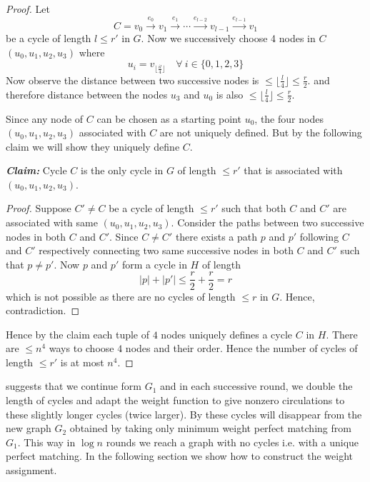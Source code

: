 \begin{proof}
	Let $$C=v_0\overset{e_0}{\longrightarrow}v_1\overset{e_1}{\longrightarrow}\cdots \overset{e_{l-2}}{\longrightarrow}v_{l-1}\overset{e_{l-1}}{\longrightarrow}v_1$$be a cycle of length $l\leq r'$ in $G$. Now we successively choose 4 nodes in $C$ $(u_0,u_1,u_2,u_3)$ where $$u_i=v_{\lfloor \frac{il}4\rfloor}\quad \forall\ i\in \{0,1,2,3\}$$Now observe the distance between two successive nodes is $\leq \lfloor \frac{l}{4}\rfloor \leq \frac{r}{2}$. and therefore distance between the nodes $u_3$ and $u_0$ is  also $\leq \lfloor \frac{l}4\rfloor\leq \frac{r}{2}$.

	Since any node of $C$ can be chosen as a starting point $u_0$, the four nodes $(u_0,u_1,u_2,u_3)$ associated with $C$ are not uniquely defined. But by the following claim we will show they uniquely define $C$.\parinf\vspace*{2mm}

	\textbf{\textit{Claim:}} Cycle $C$ is the only cycle in $G$ of length $\leq r'$ that is associated with $(u_0,u_1,u_2,u_3)$.\parinn

	\begin{proof}
		Suppose $C'\neq C$ be a cycle of length $\leq r'$ such that both $C$ and $C'$ are associated with same $(u_0, u_1,u_2, u_3)$. Consider the paths between two successive nodes in both $C$ and $C'$. Since $C\neq C'$ there exists a path $p$ and $p'$ following $C$ and $C'$ respectively connecting two same successive nodes in both $C$ and $C'$ such that $p\neq p'$. Now $p$ and $p'$ form a cycle in $H$ of length $$|p|+|p'|\leq\frac{r}{2}+\frac{r}{2}=r$$which is not possible as there are no cycles of length $\leq r$ in $G$. Hence, contradiction.
	\end{proof}
Hence by the claim each tuple of $4$ nodes uniquely defines a cycle $C$ in $H$. There are $\leq n^4$ ways to choose $4$ nodes and their order. Hence the number of cycles of length $\leq r'$ is at most $n^4$.
\end{proof}

 suggests that we continue form $G_1$ and in each successive round, we double the length of cycles and adapt the weight function to give nonzero circulations to these slightly longer cycles (twice larger). By  these cycles will disappear from the new graph $G_2$ obtained by taking only minimum weight perfect matching from $G_1$. This way in $\log n$ rounds we reach a graph with no cycles i.e. with a unique perfect matching. In the following section we show how to construct the weight assignment.
